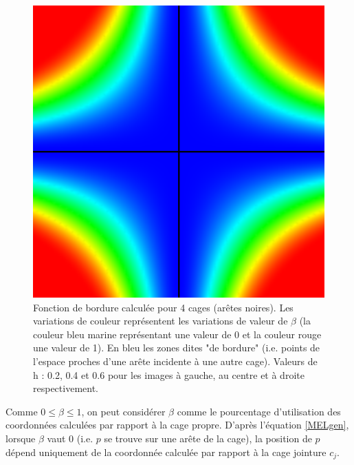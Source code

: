 \begin{figure}[h]
\begin{center}
    \includegraphics[scale=0.35]{starCage-0-6}
    \caption{Fonction de bordure calculée pour 4 cages (arêtes
      noires). Les variations de couleur représentent les variations
      de valeur de $\beta$ (la couleur bleu marine représentant une
      valeur de 0 et la couleur rouge une valeur de 1). En bleu les
      zones dites "de bordure" (i.e. points de l'espace proches d'une
      arête incidente à une autre cage). Valeurs de h : 0.2, 0.4 et
      0.6 pour les images à gauche, au centre et à droite
      respectivement.}
    \label{MELpar}
  \end{center}
\end{figure}

Comme $0 \leq \beta \leq 1$, on peut considérer $\beta$ comme le
pourcentage d'utilisation des coordonnées calculées par rapport à la
cage propre. D'après l'équation \ref{MELgen}, lorsque $\beta$ vaut 0
(i.e. $p$ se trouve sur une arête de la cage), la position de $p$
dépend uniquement de la coordonnée calculée par rapport à la cage
jointure $c_j$.

